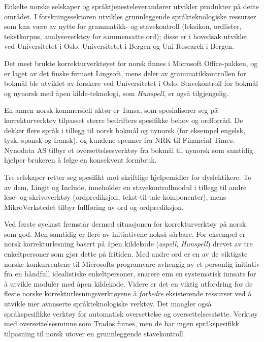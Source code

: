 \begin{multicols}{2}
Enkelte norske selskaper og språktjenesteleverandører utvikler produkter på dette området. 
I forskningssektoren utvikles grunnleggende språkteknologiske ressurser som kan være av nytte for grammatikk- og stavekontroll (leksikon, ordlister, tekstkorpus, analyseverktøy for sammensatte ord); disse er i hovedsak utviklet ved Universitetet i Oslo, Universitetet i Bergen og Uni Research i Bergen.

Det mest brukte korrekturverktøyet for norsk finnes i Microsoft Office-pakken, og er laget av det finske firmaet Lingsoft, mens deler av grammatikkontrollen for bokmål ble utviklet av forskere ved Universitetet i Oslo. Stavekontroll for bokmål og nynorsk med åpen kilde-teknologi, som \textit{Hunspell}, er også tilgjengelig. 

En annen norsk kommersiell aktør er Tansa, som spesialiserer seg på korrekturverktøy tilpasset større bedrifters spesifikke behov og ordforråd. 
De dekker flere språk i tillegg til norsk bokmål og nynorsk (for eksempel engelsk, tysk, spansk og fransk), og kundene spenner fra NRK til Financial Times. 
Nynodata AS tilbyr et oversettelsesverktøy fra bokmål til nynorsk som samtidig hjelper brukeren å følge en konsekvent formbruk.

Tre selskaper retter seg spesifikt mot skriftlige hjelpemidler for dyslektikere. To av dem, Lingit og Include, inneholder en stavekontrollmodul i tillegg til andre lese- og skriveverktøy (ordprediksjon, tekst-til-tale-komponenter), mens MikroVerkstedet tilbyr fullføring av ord og ordprediksjon.

Ved første øyekast fremstår dermed situasjonen for korrekturverktøy på norsk som god. 
Men samtidig er flere av initiativene nokså sårbare. 
For eksempel er norsk korrekturlesning basert på åpen kildekode (\textit{aspell, Hunspell}) drevet av tre enkeltpersoner som gjør dette på fritiden. 
Med andre ord er en av de viktigste norske konkurrentene til Microsofts programvare avhengig av et personlig initiativ fra en håndfull idealistiske enkeltpersoner, snarere enn en systematisk innsats for å utvikle moduler med åpen kildekode. 
Videre er det en viktig utfordring for de fleste norske korrekturlesningsverktøyene å \textit{forbedre} eksisterende ressurser ved å utvikle mer avanserte språkteknologiske verktøy.  Det mangler også språkspesifikke verktøy for automatisk oversettelse og oversettelsesstøtte. Verktøy med oversettelsesminne som Trados finnes, men de har ingen språkspesifikk tilpasning til norsk utover en grunnleggende stavekontroll.


\end{multicols}
